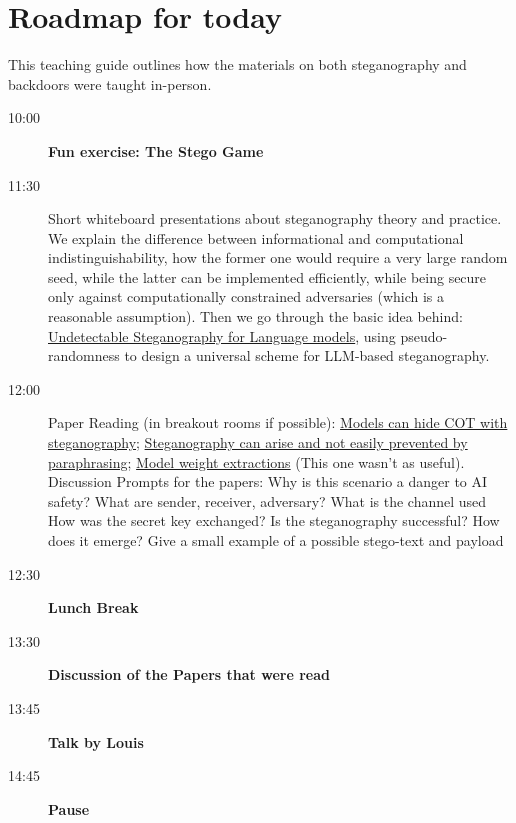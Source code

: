 \documentclass[11pt]{article}
\begin{document}
\section{Roadmap for today}
\label{sec:roadmap}

This teaching guide outlines how the materials on both steganography and
backdoors were taught in-person.

\begin{description}
  \item[10:00] \textbf{Fun exercise: The Stego Game}

  \item[11:30] Short whiteboard presentations about steganography theory and
    practice. We explain the difference between informational and
    computational indistinguishability, how the former one would require a
    very large random seed, while the latter can be implemented efficiently,
    while being secure only against computationally constrained adversaries
    (which is a reasonable assumption).
    Then we go through the basic idea behind:
    \href{https://openreview.net/pdf?id=fq6aQoMSHz}{Undetectable Steganography
    for Language models}, using pseudo-randomness to design a universal scheme
    for LLM-based steganography.

  \item[12:00] Paper Reading (in breakout rooms if possible):
    \href{https://arxiv.org/html/2506.01926v2}{Models can hide COT with
    steganography};
    \href{https://arxiv.org/pdf/2410.03768}{Steganography can arise and not
    easily prevented by paraphrasing};
    \href{https://arxiv.org/pdf/2511.02620}{Model weight extractions} (This one
    wasn't as useful).
    Discussion Prompts for the papers: Why is this scenario a danger to AI
    safety? What are sender, receiver, adversary? What is the channel used How
    was the secret key exchanged? Is the steganography successful? How does it
    emerge? Give a small example of a possible stego-text and payload

  \item[12:30] \textbf{Lunch Break}

  \item[13:30] \textbf{Discussion of the Papers that were read}

  \item[13:45] \textbf{Talk by Louis}

  \item[14:45] \textbf{Pause}


\end{description}
\end{document}
